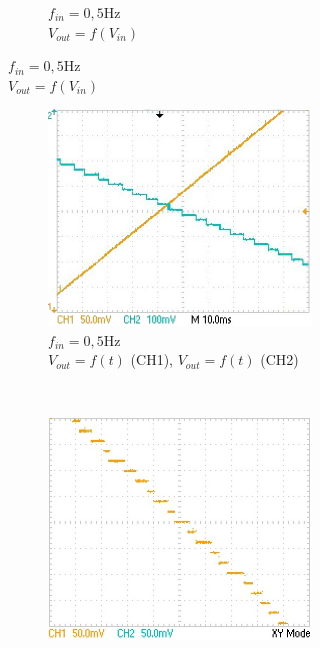 \documentclass{article}
\begin{document}
\begin{figure}
\begin{subfigure}[b]{0.3\textwidth}
\begin{subfigure}[b]{\textwidth}
			\caption{\centering $f_{in}=\mathrm{0,5 Hz}$\\$V_{out}=f(V_{in})$}
			\label{fig:slowXY}
		\end{subfigure}
	\end{subfigure}
	\hfill
	\begin{subfigure}[b]{0.3\textwidth}
		\begin{subfigure}[b]{\textwidth}
			\centering
			\includegraphics[width=\textwidth]{data/TEK0018_}
			\caption{\centering $f_{in}=\mathrm{0,5 Hz}$\\$V_{out}=f(t)$ (CH1), $V_{out}=f(t)$ (CH2)}
			\label{fig:midT}
		\end{subfigure}
		\\
		\begin{subfigure}[b]{\textwidth}
			\centering
			\includegraphics[width=\textwidth]{data/TEK0000_}

\end{subfigure}
\end{subfigure}
\end{figure}
\end{document}

